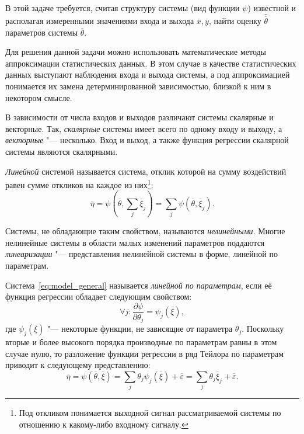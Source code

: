 В этой задаче требуется,
считая структуру системы (вид функции \( \psi \)) известной и располагая
измеренными значениями входа и выхода \( \overline{x}, \overline{y} \),
найти оценку \( \hat{\overline{\theta}} \) параметров системы \( \overline{\theta} \).

Для решения данной задачи можно использовать математические методы аппроксимации статистических данных.
В этом случае в качестве статистических данных выступают наблюдения входа и выхода системы,
а под аппроксимацией понимается их замена детерминированной зависимостью,
близкой к ним в некотором смысле. %

В зависимости от числа входов и выходов различают системы скалярные и векторные.
Так, \emph{скалярные} системы имеет всего по одному входу и выходу, а \emph{векторные} "--- несколько.
Вход и выход, а также функция регрессии скалярной системы являются скалярными.

\emph{Линейной} системой называется система,
отклик которой на сумму воздействий равен сумме откликов на каждое из них\footnote{%
  Под откликом понимается выходной сигнал рассматриваемой системы по отношению к
  какому-либо входному сигналу.}:
\begin{equation*}
  \overline{\eta} =
  \psi(\overline{\theta}, \sum_j \overline{\xi}_j) =
  \sum_j \psi(\overline{\theta}, \overline{\xi}_j).
\end{equation*}

Системы, не обладающие таким свойством, называются \emph{нелинейными}.
Многие нелинейные системы в области малых изменений параметров поддаются
\emph{линеаризации} "--- представления нелинейной системы в форме, линейной по параметрам.

Система~\eqref{eq:model_general} называется \emph{линейной по параметрам},
если её функция регрессии обладает следующим свойством:
\begin{equation*}
  \forall j: \dfrac{\partial \psi}{\partial \theta_j} = \psi_j(\overline{\xi}),
\end{equation*}
где \( \psi_j(\overline{\xi}) \) "--- некоторые функции, не зависящие от параметра \( \theta_j \).
Поскольку вторые и более высокого порядка производные по параметрам равны в этом случае нулю,
то разложение функции регрессии в ряд Тейлора по параметрам приводит к следующему представлению:
\begin{equation*}
  \overline{\eta} =
  \psi(\overline{\theta}, \overline{\xi}) =
  \sum_j \theta_j \psi_j(\overline{\xi}) + \overline{\varepsilon} =
  \sum_j \theta_j \overline{\xi}_j + \overline{\varepsilon}.
\end{equation*}

